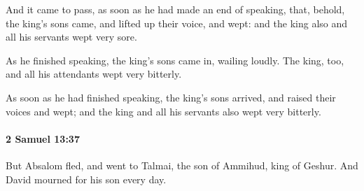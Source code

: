 			\begin{versebox}
					\item[BHS] 
					\item[ASV] And it came to pass, as soon as he had made an end of speaking, that, behold, the king's sons came, and lifted up their voice, and wept: and the king also and all his servants wept very sore.
					\item[NIV] As he finished speaking, the king’s sons came in, wailing loudly. The king, too, and all his attendants wept very bitterly.
					\item[NRSV] As soon as he had finished speaking, the king’s sons arrived, and raised their voices and wept; and the king and all his servants also wept very bitterly.
			\end{versebox}

		\paragraph{2 Samuel 13:37} %
			\label{2SAMUEL-13-37}

			But Absalom fled, and went to Talmai, the son of Ammihud, king of Geshur. And David mourned for his son every day.

